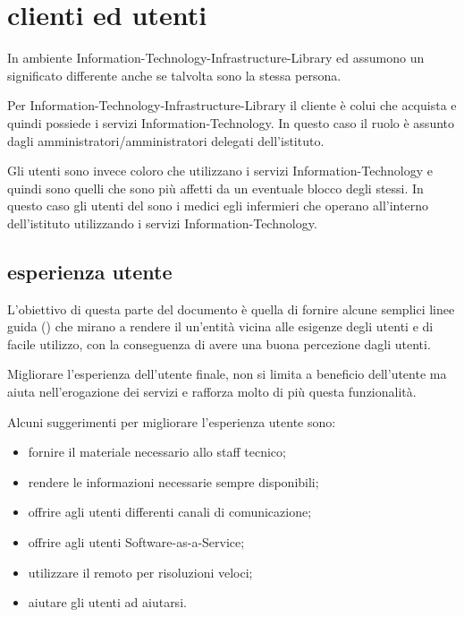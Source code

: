 %
%
\section[Clienti ed utenti]{clienti ed utenti}
\label{sd-client-users}
In ambiente \ac{Information-Technology-Infrastructure-Library}  ed  assumono un significato differente anche se talvolta sono la stessa persona.

Per \ac{Information-Technology-Infrastructure-Library} il cliente è colui che acquista e quindi possiede i servizi \acs{Information-Technology}. In questo caso il ruolo è assunto dagli amministratori/amministratori delegati dell'istituto.

Gli utenti sono invece coloro che utilizzano i servizi \acs{Information-Technology} e quindi sono quelli che sono più affetti da un eventuale blocco degli stessi. In questo caso gli utenti del  sono i medici egli infermieri che operano all'interno dell'istituto utilizzando i servizi \acs{Information-Technology}.

\subsection[Esperienza utente]{esperienza utente}
\label{sd-users-experience}
L'obiettivo di questa parte del documento è quella di fornire alcune semplici linee guida () che mirano a rendere il  un'entità vicina alle esigenze degli utenti e di facile utilizzo, con la conseguenza di avere una buona percezione dagli utenti.

Migliorare l'esperienza dell'utente finale, non si limita a beneficio dell'utente ma aiuta nell'erogazione dei servizi e rafforza molto di più questa funzionalità.

Alcuni suggerimenti per migliorare l'esperienza utente sono:

\begin{itemize}
\item{fornire il materiale necessario allo staff tecnico;}
\item{rendere le informazioni necessarie sempre disponibili;}
\item{offrire agli utenti differenti canali di comunicazione;}
\item{offrire agli utenti  \acs{Software-as-a-Service};}
\item{utilizzare il  remoto per risoluzioni veloci;}
\item{aiutare gli utenti ad aiutarsi.}
\end{itemize}

